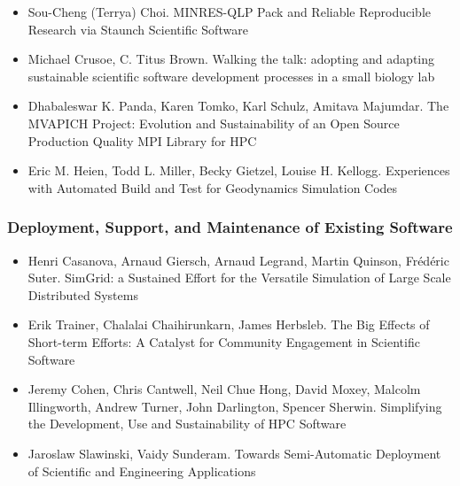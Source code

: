 \documentclass[11pt, oneside]{amsart}
\begin{document}
\begin{itemize}
\item Sou-Cheng (Terrya) Choi. MINRES-QLP Pack and Reliable
  Reproducible Research via Staunch Scientific Software~\cite{Choi_WSSSPE}

\item Michael Crusoe, C. Titus Brown. Walking the talk: adopting and
  adapting sustainable scientific software development processes in a
  small biology lab~\cite{Crusoe_WSSSPE}

\item Dhabaleswar K. Panda, Karen Tomko, Karl Schulz, Amitava Majumdar.
The MVAPICH Project: Evolution and Sustainability of an Open Source
Production Quality MPI Library for HPC~\cite{Panda_WSSSPE}

\item Eric M. Heien, Todd L. Miller, Becky Gietzel, Louise
  H. Kellogg. Experiences with Automated Build and Test for
  Geodynamics Simulation Codes~\cite{Heien_WSSSPE}

\end{itemize}

\subsubsection*{Deployment, Support, and Maintenance of Existing Software}

\begin{itemize}

\item Henri Casanova, Arnaud Giersch, Arnaud Legrand, Martin Quinson,
  Fr\'{e}d\'{e}ric Suter. SimGrid: a Sustained Effort for the
  Versatile Simulation of Large Scale Distributed
  Systems~\cite{Casanova_WSSSPE}

\item Erik Trainer, Chalalai Chaihirunkarn, James Herbsleb. The Big
  Effects of Short-term Efforts: A Catalyst for Community Engagement
  in Scientific Software~\cite{Trainer_WSSSPE}

\item Jeremy Cohen, Chris Cantwell, Neil Chue Hong, David Moxey,
  Malcolm Illingworth, Andrew Turner, John Darlington, Spencer
  Sherwin. Simplifying the Development, Use and Sustainability of HPC
  Software~\cite{Cohen_WSSSPE}

\item Jaroslaw Slawinski, Vaidy Sunderam. Towards Semi-Automatic
  Deployment of Scientific and Engineering Applications~\cite{Slawinski_WSSSPE}

\end{itemize}
\end{document}
